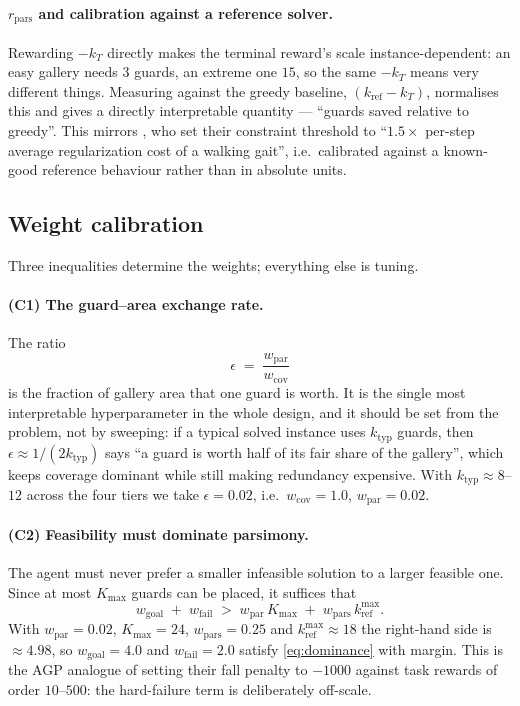 \documentclass[11pt,a4paper]{article}
\begin{document}
\paragraph{$r_{\mathrm{pars}}$ and calibration against a reference solver.}
Rewarding $-k_T$ directly makes the terminal reward's scale instance-dependent: an easy
gallery needs $3$ guards, an extreme one $15$, so the same $-k_T$ means very different
things. Measuring against the greedy baseline, $(k_{\mathrm{ref}} - k_T)$, normalises this and
gives a directly interpretable quantity --- ``guards saved relative to greedy''. This
mirrors \citet{xu2025striker}, who set their constraint threshold to
``$1.5\times$ per-step average regularization cost of a walking gait'', i.e.\ calibrated
against a known-good reference behaviour rather than in absolute units.

\subsection{Weight calibration}\label{sec:calib}

Three inequalities determine the weights; everything else is tuning.

\paragraph{(C1) The guard--area exchange rate.}
The ratio
\begin{equation}\label{eq:exchange}
  \epsilon \;=\; \frac{w_{\mathrm{par}}}{w_{\mathrm{cov}}}
\end{equation}
is the fraction of gallery area that one guard is worth. It is the single most
interpretable hyperparameter in the whole design, and it should be set from the problem,
not by sweeping: if a typical solved instance uses $k_{\mathrm{typ}}$ guards, then
$\epsilon \approx 1/(2 k_{\mathrm{typ}})$ says ``a guard is worth half of its fair share of
the gallery'', which keeps coverage dominant while still making redundancy expensive.
With $k_{\mathrm{typ}} \approx 8$--$12$ across the four tiers we take $\epsilon = 0.02$,
i.e.\ $w_{\mathrm{cov}} = 1.0$, $w_{\mathrm{par}} = 0.02$.

\paragraph{(C2) Feasibility must dominate parsimony.}
The agent must never prefer a smaller infeasible solution to a larger feasible one. Since
at most $K_{\max}$ guards can be placed, it suffices that
\begin{equation}\label{eq:dominance}
  w_{\mathrm{goal}} \;+\; w_{\mathrm{fail}} \;>\; w_{\mathrm{par}}\,K_{\max}
  \;+\; w_{\mathrm{pars}}\,k_{\mathrm{ref}}^{\max}.
\end{equation}
With $w_{\mathrm{par}} = 0.02$, $K_{\max} = 24$, $w_{\mathrm{pars}} = 0.25$ and
$k_{\mathrm{ref}}^{\max} \approx 18$ the right-hand side is $\approx 4.98$, so
$w_{\mathrm{goal}} = 4.0$ and $w_{\mathrm{fail}} = 2.0$ satisfy \eqref{eq:dominance} with margin.
This is the AGP analogue of \citet{wang2025vision} setting their fall penalty to $-1000$
against task rewards of order $10$--$500$: the hard-failure term is deliberately off-scale.
\end{document}
